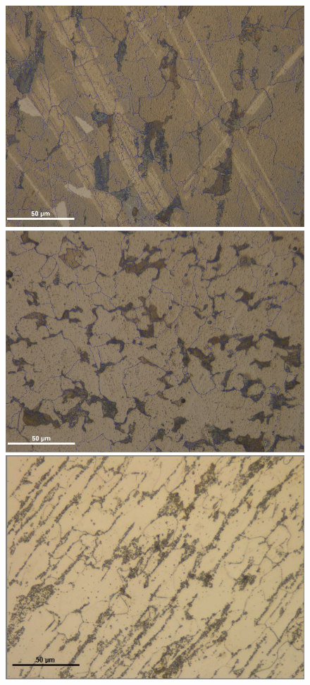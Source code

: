 \documentclass{article}
\begin{document}
\begin{figure}[h]
	\begin{minipage}{0.24\textwidth}
		\centering
		\includegraphics[scale=.16]{LASteelGrains.jpg}
	\end{minipage}
	\begin{minipage}{0.24\textwidth}
		\centering
		\includegraphics[scale=.17]{TASteelGrains.jpg}
	\end{minipage}
	\begin{minipage}{0.24\textwidth}
		\centering
		\includegraphics[scale=.22]{LARSteelGrains.jpg}

\end{minipage}
\end{figure}
\end{document}
